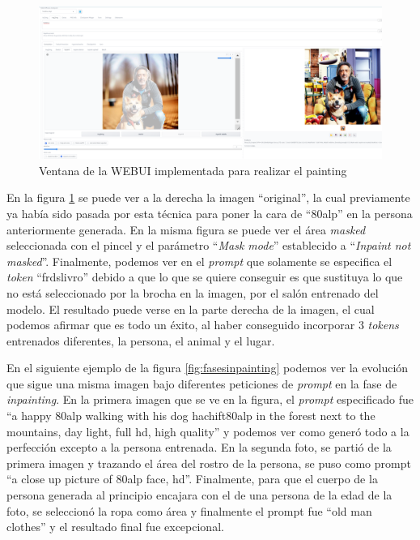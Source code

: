 \begin{figure}[h]
	\centering
	\includegraphics[width = 1
	\textwidth]{Imagenes/Vectorial/inpainting1.png}
	\caption{Ventana de la WEBUI implementada para realizar el painting}
	\label{fig:inpainting1}
\end{figure}

En la figura \ref{fig:inpainting1} se puede ver a la derecha la imagen ``original'', la cual previamente ya había sido pasada por esta técnica para poner la cara de ``80alp'' en la persona anteriormente generada. En la misma figura se puede ver el área \textit{masked} seleccionada con el pincel y el parámetro ``\textit{Mask mode}'' establecido a ``\textit{Inpaint not masked}''. Finalmente, podemos ver en el \textit{prompt} que solamente se especifica el \textit{token} ``frdslivro'' debido a que lo que se quiere conseguir es que sustituya lo que no está seleccionado por la brocha en la imagen, por el salón entrenado del modelo. El resultado puede verse en la parte derecha de la imagen, el cual podemos afirmar que es todo un éxito, al haber conseguido incorporar 3 \textit{tokens} entrenados diferentes, la persona, el animal y el lugar. 

En el siguiente ejemplo de la figura \ref{fig:fasesinpainting} podemos ver la evolución que sigue una misma imagen bajo diferentes peticiones de \textit{prompt} en la fase de \textit{inpainting}. En la primera imagen que se ve en la figura, el \textit{prompt} especificado fue ``a happy 80alp walking with his dog hachift80alp in the forest next to the mountains, day light, full hd, high quality'' y podemos ver como generó todo a la perfección excepto a la persona entrenada. En la segunda foto, se partió de la primera imagen y trazando el área del rostro de la persona, se puso como prompt ``a close up picture of 80alp face, hd''. Finalmente, para que el cuerpo de la persona generada al principio encajara con el de una persona de la edad de la foto, se seleccionó la ropa como área y finalmente el prompt fue ``old man clothes'' y el resultado final fue excepcional. 

